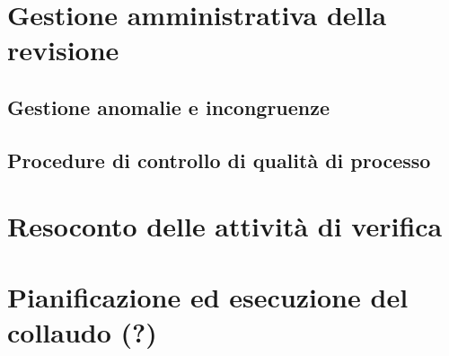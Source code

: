 \section{Gestione amministrativa della revisione}
\subsection{Gestione anomalie e incongruenze}
\subsection{Procedure di controllo di qualità di processo}

\section{Resoconto delle attività di verifica}

\section{Pianificazione ed esecuzione del collaudo (?)}


